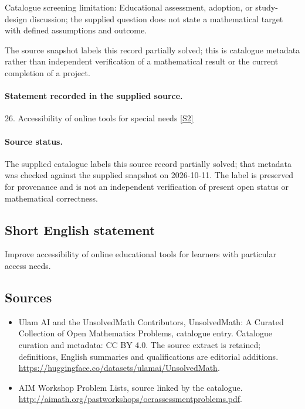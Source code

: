 \documentclass[11pt]{article}
\begin{document}
Catalogue screening limitation: Educational assessment, adoption, or study-design discussion; the supplied question does not state a mathematical target with defined assumptions and outcome.

The source snapshot labels this record partially solved; this is catalogue metadata rather than independent verification of a mathematical result or the current completion of a project.
\paragraph{Statement recorded in the supplied source.}
26. Accessibility of online tools for special needs \href{http://aimath.org/pastworkshops/oerassessmentproblems.pdf}{[S2]}
\paragraph{Source status.}
The supplied catalogue labels this source record partially solved; that metadata was checked against the supplied snapshot on 2026-10-11. The label is preserved for provenance and is not an independent verification of present open status or mathematical correctness.
\subsection{Short English statement}
Improve accessibility of online educational tools for learners with particular access needs.
\subsection{Sources}
\begin{itemize}
\item[S1] Ulam AI and the UnsolvedMath Contributors, UnsolvedMath: A Curated Collection of Open Mathematics Problems, catalogue entry. Catalogue curation and metadata: CC BY 4.0. The source extract is retained; definitions, English summaries and qualifications are editorial additions.
\url{https://huggingface.co/datasets/ulamai/UnsolvedMath}.
\item[S2] AIM Workshop Problem Lists, source linked by the catalogue.
\url{http://aimath.org/pastworkshops/oerassessmentproblems.pdf}.
\end{itemize}
\end{document}
